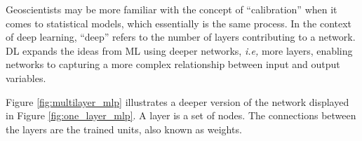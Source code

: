 Geoscientists may be more familiar with the concept of ``calibration'' when it comes to statistical models, which essentially is the same process. In the context of deep learning, ``deep'' refers to the number of layers contributing to a network. DL expands the ideas from ML using deeper networks, \textit{i.e,} more layers, enabling networks to capturing a more complex relationship between input and output variables.

Figure \ref{fig:multilayer_mlp} illustrates a deeper version of the network displayed in Figure \ref{fig:one_layer_mlp}. A layer is a set of nodes. The connections between the layers are the trained units, also known as weights. 

